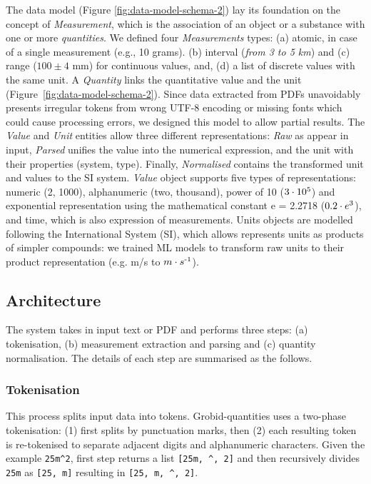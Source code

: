 \documentclass[sigconf]{acmart}
\begin{document}
The data model (Figure \ref{fig:data-model-schema-2}) lay its foundation on the concept of \textit{Measurement}, which is the association of an object or a substance with one or more \textit{quantities}. We defined four \textit{Measurements} types: (a) atomic, in case of a single measurement (e.g., 10 grams). (b) interval (\textit{from 3 to 5 km}) and (c) range ($100 \pm 4$ mm) for continuous values, and, (d) a list of discrete values with the same unit. A \textit{Quantity} links the quantitative value and the unit (Figure~\ref{fig:data-model-schema-2}). 
Since data extracted from PDFs unavoidably presents irregular tokens from wrong UTF-8 encoding or missing fonts which could cause processing errors, we designed this model to allow partial results. The \textit{Value} and \textit{Unit} entities allow three different representations: \textit{Raw} as appear in input, \textit{Parsed} unifies the value into the numerical expression, and the unit with their properties (system, type). Finally, \textit{Normalised} contains the transformed unit and values to the SI system. \textit{Value} object supports five types of representations: numeric (2, 1000), alphanumeric (two, thousand), power of 10 ($3\cdot10\textsuperscript{5}$) and exponential representation using the mathematical constant e = 2.2718 ($0.2\cdot e\textsuperscript{3}$), and time, which is also expression of measurements. Units objects are modelled following the International System (SI), which allows represents units as products of simpler compounds: we trained ML models to transform raw units to their product representation (e.g. m/s to $m \cdot s\textsuperscript{-1}$).

\subsection{Architecture}
The system takes in input text or PDF and performs three steps: (a) tokenisation, (b) measurement extraction and parsing and (c) quantity normalisation. The details of each step are summarised as the follows.

\subsubsection{Tokenisation}
This process splits input data into tokens. Grobid-quantities uses a two-phase tokenisation: (1) first splits by punctuation marks, then (2) each resulting token is re-tokenised to separate adjacent digits and alphanumeric characters. Given the example \texttt{25m\^{}2}, first step returns a list \texttt{[25m, \^{}, 2]} and then recursively divides \texttt{25m} as \texttt{[25, m]}  resulting in \texttt{[25, m, \^{}, 2]}.
\end{document}
